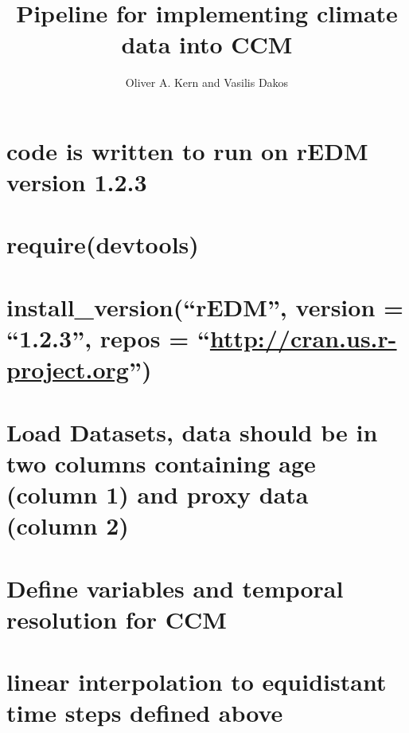\documentclass[
]{article}
\title{Pipeline for implementing climate data into CCM}
\author{Oliver A. Kern and Vasilis Dakos}
\date{}
\begin{document}
\maketitle

\hypertarget{code-is-written-to-run-on-redm-version-1.2.3}{%
\section{code is written to run on rEDM version
1.2.3}\label{code-is-written-to-run-on-redm-version-1.2.3}}

\hypertarget{requiredevtools}{%
\section{require(devtools)}\label{requiredevtools}}

\hypertarget{install_versionredm-version-1.2.3-repos-httpcran.us.r-project.org}{%
\section{\texorpdfstring{install\_version(``rEDM'', version = ``1.2.3'',
repos =
``\url{http://cran.us.r-project.org}'')}{install\_version(``rEDM'', version = ``1.2.3'', repos = ``http://cran.us.r-project.org'')}}\label{install_versionredm-version-1.2.3-repos-httpcran.us.r-project.org}}

\hypertarget{load-datasets-data-should-be-in-two-columns-containing-age-column-1-and-proxy-data-column-2}{%
\section{Load Datasets, data should be in two columns containing age
(column 1) and proxy data (column
2)}\label{load-datasets-data-should-be-in-two-columns-containing-age-column-1-and-proxy-data-column-2}}

\hypertarget{define-variables-and-temporal-resolution-for-ccm}{%
\section{Define variables and temporal resolution for
CCM}\label{define-variables-and-temporal-resolution-for-ccm}}

\hypertarget{linear-interpolation-to-equidistant-time-steps-defined-above}{%
\section{linear interpolation to equidistant time steps defined
above}\label{linear-interpolation-to-equidistant-time-steps-defined-above}}
\end{document}
